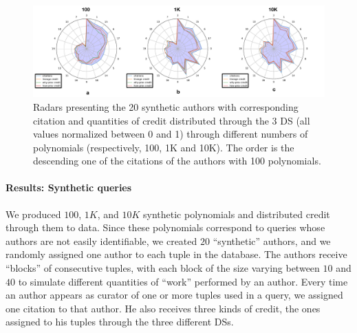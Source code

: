 
\begin{figure}[t]
\centering
  \includegraphics[width=1\textwidth]{figures/fixed_radars}
  \caption{
  Radars presenting the 20 synthetic authors with corresponding citation and quantities of credit distributed through the 3 DS (all values normalized between 0 and 1) through different numbers of polynomials (respectively, 100, 1K and 10K). 
  The order is the descending one of the citations of the authors with 100 polynomials. }
  \label{figure:3_radars}
\end{figure}

\paragraph{Results: Synthetic queries}
We produced $100$, $1K$, and $10K$ synthetic polynomials and distributed credit through them to data. 
Since these polynomials correspond to queries whose authors are not easily identifiable, we created $20$ ``synthetic'' authors, and we randomly assigned one author to each tuple in the database. The authors receive ``blocks'' of consecutive tuples, with each block of the size varying between $10$ and $40$ to simulate different quantities of ``work'' performed by an author. 
Every time an author appears as curator of one or more tuples used in a query, we assigned one citation to that author.  
He also receives three kinds of credit, the ones assigned to his tuples through the three different DSs.

